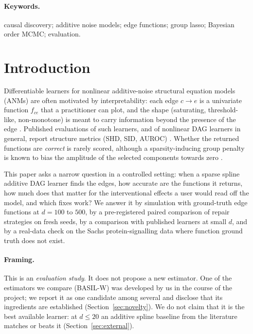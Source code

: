 \documentclass[11pt,a4paper]{article}
\begin{document}
\paragraph{Keywords.} causal discovery; additive noise models; edge functions; group lasso; Bayesian order MCMC; evaluation.

\section{Introduction}
\label{sec:intro}

Differentiable learners for nonlinear additive-noise structural equation models (ANMs) are often motivated by interpretability: each edge $c\to e$ is a univariate function $f_{ce}$ that a practitioner can plot, and the shape (saturating, threshold-like, non-monotone) is meant to carry information beyond the presence of the edge \citep{agarwal2021,liu2025kan,dang_spade}. Published evaluations of such learners, and of nonlinear DAG learners in general, report structure metrics (SHD, SID, AUROC) \citep{zheng2020,lachapelle2020,rolland2022,montagna2023nogam}. Whether the returned functions are \emph{correct} is rarely scored, although a sparsity-inducing group penalty is known to bias the amplitude of the selected components towards zero \citep{huang2010,belloni2013}.

This paper asks a narrow question in a controlled setting: when a sparse spline additive DAG learner finds the edges, how accurate are the functions it returns, how much does that matter for the interventional effects a user would read off the model, and which fixes work? We answer it by simulation with ground-truth edge functions at $d=100$ to $500$, by a pre-registered paired comparison of repair strategies on fresh seeds, by a comparison with published learners at small $d$, and by a real-data check on the Sachs protein-signalling data where function ground truth does not exist.

\paragraph{Framing.} This is an \emph{evaluation study}. It does not propose a new estimator. One of the estimators we compare (BASIL-W) was developed by us in the course of the project; we report it as one candidate among several and disclose that its ingredients are established (Section~\ref{sec:novelty}). We do not claim that it is the best available learner: at $d\le20$ an additive spline baseline from the literature matches or beats it (Section~\ref{sec:external}).
\end{document}
